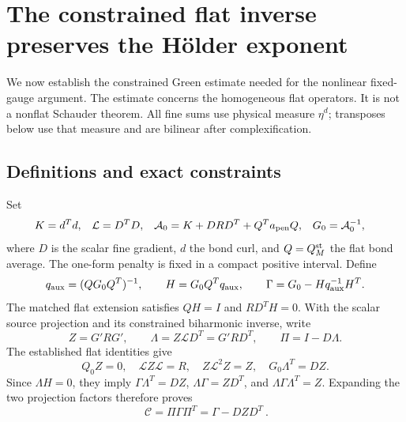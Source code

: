 \documentclass[11pt]{article}
\theoremstyle{remark}
\newcommand{\norm}[1]{\left\|#1\right\|}
\begin{document}

\section{The constrained flat inverse preserves the H\"older exponent}
\label{cg-section}

We now establish the constrained Green estimate needed for the
nonlinear fixed-gauge argument. The estimate concerns the
homogeneous flat operators. It is not a nonflat Schauder theorem.
All fine sums use physical measure $\eta^d$; transposes below use
that measure and are bilinear after complexification.

\subsection{Definitions and exact constraints}
\label{cg-algebra}

Set
\begin{align}
 K&=d^Td,&\mathcal L&=D^TD,&
 \mathcal A_0&=K+DRD^T+Q^Ta_{\rm pen}Q,&G_0&=\mathcal A_0^{-1},
                                                        \label{cg-flat}\end{align}
where $D$ is the scalar fine gradient, $d$ the bond curl, and
$Q=Q_M^{\rm st}$ the flat bond average. The one-form penalty is
fixed in a compact positive interval. Define
\begin{equation}\label{cg-extension}
 q_{\rm aux}=(QG_0Q^T)^{-1},\qquad
 H=G_0Q^Tq_{\rm aux},\qquad
 \Gamma=G_0-Hq_{\rm aux}^{-1}H^T.
\end{equation}
The matched flat extension satisfies $QH=I$ and $RD^TH=0$.
With the scalar source projection and its constrained biharmonic
inverse, write
\begin{equation}\label{cg-projection}
 Z=G'RG',\qquad \Lambda=Z\mathcal LD^T=G'RD^T,
 \qquad \Pi=I-D\Lambda.
\end{equation}
The established flat identities give
\begin{equation}\label{cg-scalar-identities}
 Q_0Z=0,\quad \mathcal LZ\mathcal L=R,\quad
 Z\mathcal L^2Z=Z,\quad G_0\Lambda^T=DZ.
\end{equation}
Since $\Lambda H=0$, they imply
$\Gamma\Lambda^T=DZ$,
$\Lambda\Gamma=ZD^T$, and
$\Lambda\Gamma\Lambda^T=Z$.
Expanding the two projection factors therefore proves
\begin{equation}\label{cg-constrained}
 \boxed{\ \mathcal C=\Pi\Gamma\Pi^T=\Gamma-DZD^T\ }.
\end{equation}
\end{document}
